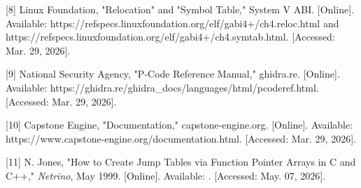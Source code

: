 \documentclass[
]{article}
\begin{document}
{[}8{]} Linux Foundation, "Relocation" and "Symbol Table," System V ABI.
{[}Online{]}. Available:
https://refspecs.linuxfoundation.org/elf/gabi4+/ch4.reloc.html and
https://refspecs.linuxfoundation.org/elf/gabi4+/ch4.symtab.html.
{[}Accessed: Mar. 29, 2026{]}.

{[}9{]} National Security Agency, "P-Code Reference Manual," ghidra.re.
{[}Online{]}. Available:
https://ghidra.re/ghidra\_docs/languages/html/pcoderef.html.
{[}Accessed: Mar. 29, 2026{]}.

{[}10{]} Capstone Engine, "Documentation," capstone-engine.org.
{[}Online{]}. Available:
https://www.capstone-engine.org/documentation.html. {[}Accessed: Mar.
29, 2026{]}.

{[}11{]} N. Jones, "How to Create Jump Tables via Function Pointer
Arrays in C and C++," \emph{Netrino}, May 1999. {[}Online{]}. Available:
. {[}Accessed: May. 07, 2026{]}.
\end{document}

